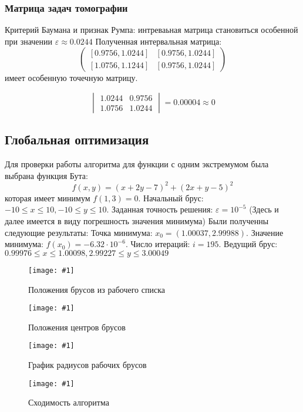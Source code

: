 \documentclass[a4paper,12pt]{article}
\newcommand{\plot}[3]{
    \begin{figure}[H]
        \centering
        \texttt{[image: \#1]}
        \caption{#2}
        \label{#3}
    \end{figure}
}
\begin{document}
    \subsubsection{Матрица задач томографии}
    Критерий Баумана и признак Румпа: интреваьная матрица становиться особенной при значении
    $ \varepsilon \approx 0.0244 $
    Полученная интервальная матрица:
    \begin{equation}
        \begin{pmatrix}
            [0.9756, 1.0244] & [0.9756, 1.0244]\\
            [1.0756, 1.1244] & [0.9756, 1.0244]
        \end{pmatrix}
    \end{equation}
    имеет особенную точечную матрицу.

    \begin{equation}
        \begin{vmatrix}
            1.0244 & 0.9756\\
            1.0756 & 1.0244
        \end{vmatrix}
        = 0.00004 \approx 0
    \end{equation}

    \subsection{Глобальная оптимизация}
    Для проверки работы алгоритма для функции с одним экстремумом была выбрана функция Бута:
    \begin{equation}
        f(x, y) = (x + 2y - 7)^{2} + (2x + y -5)^{2}
    \end{equation}
    которая имеет минимум $ f(1, 3) = 0 $.
    Начальный брус: $ -10 \leq x \leq 10, -10 \leq y \leq 10 $. Заданная точность решения: $ \varepsilon = 10^{-5} $ (Здесь и далее имеется в виду погрешность значения минимума)
    \newline
    Были полученны следующие результаты:
    \newline
    Точка минимума: $ x_{0} =  (1.00037, 2.99988) $.\newline
    Значение минимума: $ f(x_{0}) = -6.32 \cdot 10^{-6} $.\newline
    Число итераций: $ i = 195 $.\newline
    Ведущий брус: $ 0.99976 \leq x \leq 1.00098, 2.99227 \leq y \leq 3.00049 $
    \plot{BoothFunctionBoxes}{Положения брусов из рабочего списка}{p:BoothBoxes}
    \plot{BoothFunctionCenters}{Положения центров брусов}{p:BoothCenters}
    \plot{BoothFunctionRads}{График радиусов рабочих брусов}{p:BoothRads}
    \plot{BoothFunctionConvergence}{Сходимость алгоритма}{p:BoothConv}
\end{document}
